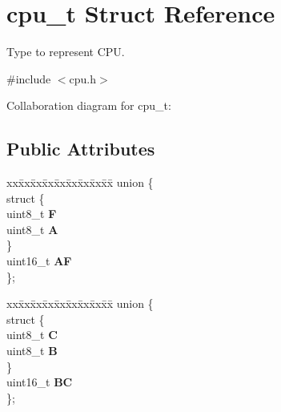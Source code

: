 \hypertarget{structcpu__t}{}\section{cpu\+\_\+t Struct Reference}
\label{structcpu__t}


Type to represent C\+PU.  




{\ttfamily \#include $<$cpu.\+h$>$}



Collaboration diagram for cpu\+\_\+t\+:
\subsection*{Public Attributes}
\begin{DoxyCompactItemize}
\item 
\mbox{\label{structcpu__t_a3213ad30bcbbc1afe7e4f2f83057c71c}} 
\begin{tabbing}
xx\=xx\=xx\=xx\=xx\=xx\=xx\=xx\=xx\=\kill
union \{\\
\mbox{\label{unioncpu__t_1_1_0D0_a94b48766370b9f76a590211d187ecb71}} 
\>struct \{\\
\>\>uint8\_t {\bfseries F}\\
\>\>uint8\_t {\bfseries A}\\
\>\} \\
\>uint16\_t {\bfseries AF}\\
\}; \\

\end{tabbing}\item 
\mbox{\label{structcpu__t_a1cdeae8c044264a7a016dc0832232f5e}} 
\begin{tabbing}
xx\=xx\=xx\=xx\=xx\=xx\=xx\=xx\=xx\=\kill
union \{\\
\mbox{\label{unioncpu__t_1_1_0D2_acf473b16f3929c38c5d888b84d316d74}} 
\>struct \{\\
\>\>uint8\_t {\bfseries C}\\
\>\>uint8\_t {\bfseries B}\\
\>\} \\
\>uint16\_t {\bfseries BC}\\
\}; \\


\end{tabbing}
\end{DoxyCompactItemize}
